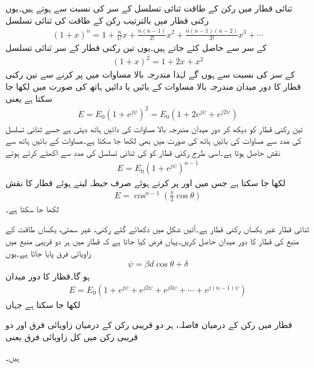 ثنائی قطار میں رکن کے طاقت ثنائی تسلسل کے سر کی نسبت سے ہوتے ہیں۔یوں  رکنی قطار میں بالترتیب رکن کے طاقت  کی ثنائی تسلسل
\begin{align}
(1+x)^n =1+\frac{n}{1!}x+\frac{n(n-1)}{2!}x^2+\frac{n(n-1)(n-2)}{3!}x^3+\cdots
\end{align}
  کے سر سے حاصل کئے جاتے ہیں۔یوں تین رکنی قطار کے سر ثنائی تسلسل
\begin{align}
(1+x)^2=1+2x+x^2
\end{align} 
کے سر کی نسبت  سے  ہوں گے لہٰذا مندرجہ بالا مساوات میں  پر کرنے سے تین رکنی قطار کا دور میدان مندرجہ بالا مساوات کے بائیں یا دائیں ہاتھ کی صورت میں لکھا جا سکتا ہے یعنی 
\begin{align}
E=E_0\left(1+e^{j\psi} \right)^2 =E_0 (1+2e^{j\psi} +e^{j 2\psi})
\end{align}
تین رکنی قطار کو دیکھ کر دور میدان مندرجہ بالا مساوات کی دائیں ہاتھ دیتی ہے جسے ثنائی تسلسل کی مدد سے مساوات کی بائیں ہاتھ کی صورت میں بھی لکھا جا سکتا ہے۔مساوات کے بائیں ہاتھ سے نقش  حاصل ہوتا ہے۔اسی طرح  رکنی قطار کو  کی ثنائی تسلسل کی مدد سے اکھٹے کرتے ہوئے
\begin{align}
E=E_0 \left(1+e^{j\psi} \right)^{n-1}
\end{align}
لکھا جا سکتا ہے جس میں  اور  پر کرتے ہوئے صرف حیطہ لیتے ہوئے قطار کا نقش
\begin{align}
E=\cos^{n-1} \left(\frac{\pi}{2} \cos \theta\right)
\end{align}
لکھا جا سکتا ہے۔

ثنائی قطار غیر یکساں رکنی قطار ہے۔آئیں شکل میں دکھائے گئے  رکنی، غیر سمتی،  یکساں طاقت کے منبع کی قطار کا دور میدان حاصل کریں۔یہاں فرض کیا جاتا ہے کہ قطار میں ہر دو قریبی منبع میں  زاویائی فرق پایا جاتا ہے۔یوں
\begin{align}
\psi=\beta d \cos \theta +\delta
\end{align}
ہو گا۔قطار  کا دور میدان
\begin{align}\label{مساوات_اینٹینا_یکساں_قطار_الف}
E=E_0\left(1+e^{j \psi}+e^{j 2 \psi}+e^{j 3 \psi} +\cdots +e^{j(n-1)\psi} \right)
\end{align}
لکھا جا سکتا ہے جہاں
\begin{description}
 قطار میں رکن کے درمیان فاصلہ،
 ہر دو قریبی رکن کے درمیان زاویائی فرق اور
 دو قریبی رکن میں کل زاویائی فرق یعنی 
\end{description}
ہیں۔

